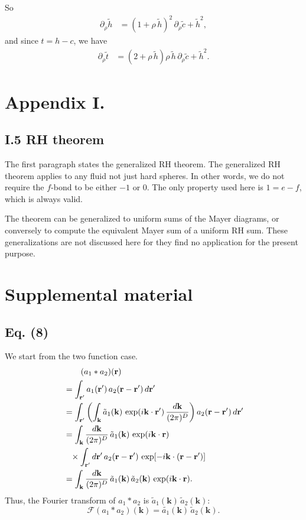 \documentclass[preprint]{revtex4-1}
\numberwithin{equation}{subsection}
\numberwithin{table}{section}
\newcommand{\vct}[1]{\mathbf{#1}}
\providecommand{\vr}{} %
\renewcommand{\vr}{\vct{r}}
\newcommand{\vk}{\vct{k}}
\newcommand{\dvk}{\frac{d\vk}{(2\pi)^D}}
\newcommand{\FT}{\mathscr{F}}
\begin{document}
So
\begin{align*}
\partial_\rho \tilde h
&=
(1 + \rho \, \tilde h)^2 \,
\partial_\rho \tilde c
+ \tilde h^2,
\end{align*}
and since $t = h - c$, we have
\begin{align*}
\partial_\rho \tilde t
&=
(2 + \rho \, \tilde h) \rho \, \tilde h \,
\partial_\rho \tilde c
+ \tilde h^2.
\end{align*}



\section{Appendix I.}



\subsection{I.5 RH theorem}



The first paragraph states the generalized RH theorem.
%
The generalized RH theorem applies to any fluid
not just hard spheres.
%
In other words, we do not require the $f$-bond
to be either $-1$ or $0$.
%
The only property used here is $1 = e - f$,
which is always valid.

The theorem can be generalized to uniform sums of
the Mayer diagrams,
or conversely to compute the equivalent Mayer sum
of a uniform RH sum.
%
These generalizations are not discussed here
for they find no application for the present purpose.



\section{Supplemental material}

\subsection{Eq. (8)}

We start from the two function case.
%
\begin{align}
& \hphantom{=\int} (a_1 * a_2)(\vr)
\notag \\
&=
  \int_{\vr'}
    a_1(\vr') \,
    a_2(\vr - \vr') \, d\vr'
\notag \\
&=
  \int_{\vr'}
    \left(
      \int_\vk \tilde{a}_1(\vk) \, \exp(i\vk\cdot\vr') \, \dvk
    \right)
    a_2(\vr - \vr') \, d\vr'
\notag \\
&=
  \int_\vk \dvk \,
  \tilde{a}_1(\vk) \,
  \exp(i\vk\cdot\vr)
\notag \\
&\hphantom{=}\times
  \int_{\vr'} d\vr' \,
    a_2(\vr - \vr') \, \exp[-i\vk\cdot(\vr - \vr')]
\notag \\
&=
  \int_\vk \dvk \,
  \tilde{a}_1(\vk) \,
  \tilde{a}_2(\vk) \,
  \exp(i\vk\cdot\vr).
  \label{eq:convol}
\end{align}
Thus, the Fourier transform of $a_1 * a_2$ is
$\tilde{a}_1(\vk) \, \tilde{a}_2(\vk)$:
\[
  \FT(a_1 * a_2)(\vk) = \tilde{a_1}(\vk) \, \tilde{a}_2(\vk).
\]
\end{document}
